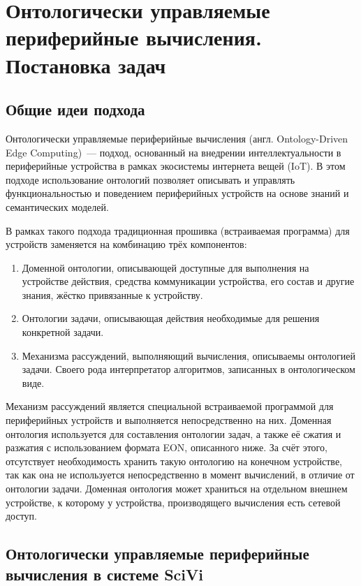 \chapter{Онтологически управляемые периферийные вычисления. Постановка задач}

\section{Общие идеи подхода}

Онтологически управляемые периферийные вычисления (англ. Ontology-Driven Edge Computing)~--- подход, основанный на внедрении интеллектуальности в периферийные устройства в рамках экосистемы интернета вещей (IoT)\cite{incollection:odec}. 
В этом подходе использование онтологий позволяет описывать и управлять функциональностью и поведением периферийных устройств на основе знаний и семантических моделей.

В рамках такого подхода традиционная прошивка (встраиваемая программа) для устройств заменяется на комбинацию трёх компонентов:
\begin{enumerate}
	\item Доменной онтологии, описывающей доступные для выполнения на устройстве действия, средства коммуникации устройства, его состав и другие знания, жёстко привязанные к устройству.
	\item Онтологии задачи, описывающая действия необходимые для решения конкретной задачи.
	\item Механизма рассуждений, выполняющий вычисления, описываемы онтологией задачи.
	Своего рода интерпретатор алгоритмов, записанных в онтологическом виде.
\end{enumerate}

Механизм рассуждений является специальной встраиваемой программой для периферийных устройств и выполняется непосредственно на них.
Доменная онтология используется для составления онтологии задач, а также её сжатия и разжатия с использованием формата EON, описанного ниже.
За счёт этого, отсутствует необходимость хранить такую онтологию на конечном устройстве, так как она не используется непосредственно в момент вычислений, в отличие от онтологии задачи.
Доменная онтология может храниться на отдельном внешнем устройстве, к которому у устройства, производящего вычисления есть сетевой доступ.

\section{Онтологически управляемые периферийные вычисления в системе SciVi}

